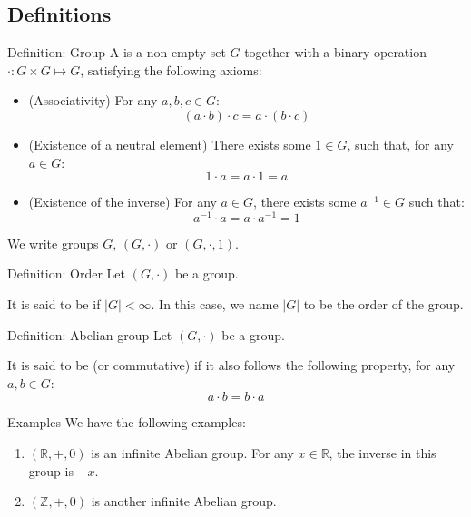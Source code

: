 \documentclass[a4paper]{article}
\begin{document}
\subsection{Definitions}

\begin{parag}{Definition: Group}
    A  is a non-empty set $G$ together with a binary operation $\cdot: G \times G \mapsto G$, satisfying the following axioms:
    \begin{itemize}
        \item (Associativity) For any $a, b, c \in G$:
        \[\left(a\cdot b\right)\cdot c = a\cdot \left(b\cdot c\right)\]
        \item (Existence of a neutral element) There exists some $1 \in G$, such that, for any $a \in G$:
        \[1\cdot a = a\cdot 1 = a\]
        \item (Existence of the inverse) For any $a \in G$, there exists some $a^{-1} \in G$ such that:
        \[a^{-1} \cdot a = a\cdot a^{-1} = 1\]
    \end{itemize}

    We write groups $G$, $\left(G, \cdot \right)$ or $\left(G, \cdot , 1\right)$.
\end{parag}

\begin{parag}{Definition: Order}
    Let $\left(G, \cdot \right)$ be a group. 

    It is said to be  if $\left|G\right| < \infty$. In this case, we name $\left|G\right|$ to be the order of the group.
\end{parag}

\begin{parag}{Definition: Abelian group}
    Let $\left(G, \cdot \right)$ be a group.

    It is said to be  (or commutative) if it also follows the following property, for any $a, b \in G$: 
    \[a\cdot b = b\cdot a\]
\end{parag}

\begin{parag}{Examples}
    We have the following examples:
    \begin{enumerate}
        \item $\left(\mathbb{R}, +, 0\right)$ is an infinite Abelian group. For any $x \in \mathbb{R}$, the inverse in this group is $-x$.
        \item $\left(\mathbb{Z}, +, 0\right)$ is another infinite Abelian group.
    \end{enumerate}
\end{parag}
\end{document}
